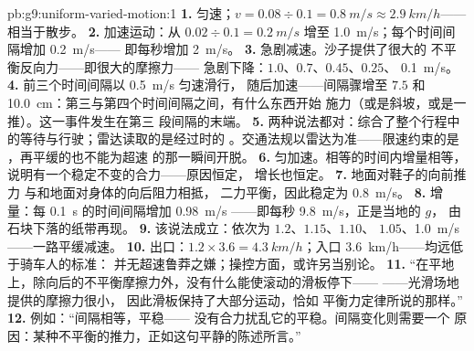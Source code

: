 \begin{solution}{pb:g9:uniform-varied-motion:1}
\textbf{1.} 匀速；$v = 0.08 \div 0.1 = \qty{0.8}{m/s}
\approx \qty{2.9}{km/h}$——相当于散步。
\textbf{2.} 加速运动：从 $0.02 \div 0.1 = \qty{0.2}{m/s}$
增至 \qty{1.0}{m/s}；每个时间间隔增加 \qty{0.2}{m/s}——
即每秒增加 \qty{2}{m/s}。
\textbf{3.} 急剧减速。沙子提供了很大的
不平衡反向力——即很大的摩擦力——
急剧下降：$1.0$、$0.7$、$0.45$、$0.25$、
\qty{0.1}{m/s}。
\textbf{4.} 前三个时间间隔以 \qty{0.5}{m/s} 匀速滑行，
随后加速——间隔骤增至 $7.5$ 和
\qty{10.0}{cm}：第三与第四个时间间隔之间，有什么东西开始
施力（或是斜坡，或是一推）。这一事件发生在第三
段间隔的末端。
\textbf{5.} 两种说法都对：综合了整个行程中
的等待与行驶；雷达读取的是经过时的
。交通法规以雷达为准——限速约束的是
，再平缓的也不能为超速
的那一瞬间开脱。
\textbf{6.} 匀加速。相等的时间内增量相等，
说明有一个稳定不变的合力——原因恒定，
增长也恒定。
\textbf{7.} 地面对鞋子的向前推力
与和地面对身体的向后阻力相抵，
二力平衡，因此稳定为 \qty{0.8}{m/s}。
\textbf{8.} 增量：每 \qty{0.1}{s} 的时间间隔增加 \qty{0.98}{m/s}
——即每秒 \qty{9.8}{m/s}，正是当地的 $g$，
由石块下落的纸带再现。
\textbf{9.} 该说法成立：依次为 $1.2$、$1.15$、$1.10$、
$1.05$、\qty{1.0}{m/s}——一路平缓减速。
\textbf{10.} 出口：$1.2 \times 3.6 = \qty{4.3}{km/h}$；入口
\qty{3.6}{km/h}——均远低于骑车人的标准：
并无超速鲁莽之嫌；操控方面，或许另当别论。
\textbf{11.} “在平地上，除向后的不平衡摩擦力外，没有什么能使滚动的滑板停下——
——光滑场地提供的摩擦力很小，
因此滑板保持了大部分运动，恰如
平衡力定律所说的那样。”
\textbf{12.} 例如：“间隔相等，平稳——
没有合力扰乱它的平稳。间隔变化则需要一个
原因：某种不平衡的推力，正如这句平静的陈述所言。”
\end{solution}

